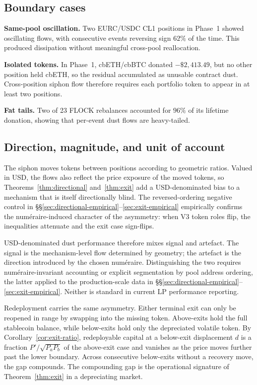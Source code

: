 \documentclass[11pt,a4paper]{article}
\theoremstyle{plain}
\begin{document}
\subsection{Boundary cases}\label{sec:boundary}

\textbf{Same-pool oscillation.} Two EURC/USDC CL1 positions in Phase~1 showed oscillating flows, with consecutive events reversing sign $62\%$ of the time. This produced dissipation without meaningful cross-pool reallocation.

\textbf{Isolated tokens.} In Phase~1, cbETH/cbBTC donated $-\$2{,}413.49$, but no other position held cbETH, so the residual accumulated as unusable contract dust. Cross-position siphon flow therefore requires each portfolio token to appear in at least two positions.

\textbf{Fat tails.} Two of 23 FLOCK rebalances accounted for $96\%$ of its lifetime donation, showing that per-event dust flows are heavy-tailed.

\subsection{Direction, magnitude, and unit of account}\label{sec:direction-discussion}

The siphon moves tokens between positions according to geometric ratios. Valued in USD, the flows also reflect the price exposure of the moved tokens, so Theorems~\ref{thm:directional} and~\ref{thm:exit} add a USD-denominated bias to a mechanism that is itself directionally blind. The reversed-ordering negative control in \S\S\ref{sec:directional-empirical}--\ref{sec:exit-empirical} empirically confirms the numéraire-induced character of the asymmetry: when V3 token roles flip, the inequalities attenuate and the exit case sign-flips.

USD-denominated dust performance therefore mixes signal and artefact. The signal is the mechanism-level flow determined by geometry; the artefact is the direction introduced by the chosen num\'eraire. Distinguishing the two requires num\'eraire-invariant accounting or explicit segmentation by pool address ordering, the latter applied to the production-scale data in \S\S\ref{sec:directional-empirical}--\ref{sec:exit-empirical}. Neither is standard in current LP performance reporting.

Redeployment carries the same asymmetry. Either terminal exit can only be reopened in range by swapping into the missing token. Above-exits hold the full stablecoin balance, while below-exits hold only the depreciated volatile token. By Corollary~\ref{cor:exit-ratio}, redeployable capital at a below-exit displacement $d$ is a fraction $P'/\sqrt{P_a P_b}$ of the above-exit case and vanishes as the price moves further past the lower boundary. Across consecutive below-exits without a recovery move, the gap compounds. The compounding gap is the operational signature of Theorem~\ref{thm:exit} in a depreciating market.
\end{document}
